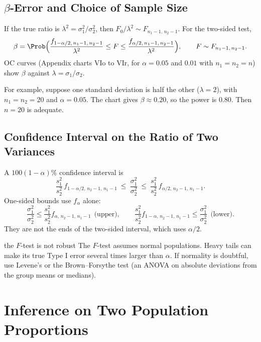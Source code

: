 \subsection{$\beta$-Error and Choice of Sample Size}

If the true ratio is $\lambda^2=\sigma_1^2/\sigma_2^2$, then $F_0/\lambda^2\sim F_{n_1-1,\,n_2-1}$. For the two-sided test,
\[ \beta=\Prob\Big(\frac{f_{1-\alpha/2,\,n_1-1,\,n_2-1}}{\lambda^2}\le F\le\frac{f_{\alpha/2,\,n_1-1,\,n_2-1}}{\lambda^2}\Big),\qquad F\sim F_{n_1-1,\,n_2-1}. \]
OC curves (Appendix charts VIo to VIr, for $\alpha=0.05$ and $0.01$ with $n_1=n_2=n$) show $\beta$ against $\lambda=\sigma_1/\sigma_2$.

For example, suppose one standard deviation is half the other ($\lambda=2$), with $n_1=n_2=20$ and $\alpha=0.05$. The chart gives $\beta\approx0.20$, so the power is $0.80$. Then $n=20$ is adequate.

\subsection{Confidence Interval on the Ratio of Two Variances}

\begin{theorem}\label{thm:f-ci}
A $100(1-\alpha)\%$ confidence interval is
\[ \frac{s_1^2}{s_2^2}\,f_{1-\alpha/2,\,n_2-1,\,n_1-1}\ \le\ \frac{\sigma_1^2}{\sigma_2^2}\ \le\ \frac{s_1^2}{s_2^2}\,f_{\alpha/2,\,n_2-1,\,n_1-1}. \]
One-sided bounds use $f_\alpha$ alone:
\[ \frac{\sigma_1^2}{\sigma_2^2}\le\frac{s_1^2}{s_2^2}f_{\alpha,\,n_2-1,\,n_1-1}\ \ \text{(upper)},\qquad \frac{s_1^2}{s_2^2}f_{1-\alpha,\,n_2-1,\,n_1-1}\le\frac{\sigma_1^2}{\sigma_2^2}\ \ \text{(lower)}. \]
They are not the ends of the two-sided interval, which uses $\alpha/2$.
\end{theorem}

\begin{pitfall}{the $F$-test is not robust}
The $F$-test assumes normal populations. Heavy tails can make its true Type I error several times larger than $\alpha$. If normality is doubtful, use Levene's or the Brown--Forsythe test (an ANOVA on absolute deviations from the group means or medians).
\end{pitfall}

\section{Inference on Two Population Proportions}

